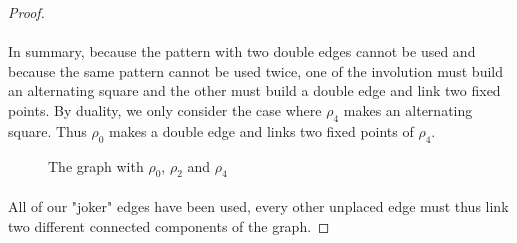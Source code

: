 \begin{proof}
\paragraph{}
In summary, because the pattern with two double edges cannot be used and because the same pattern cannot be used twice, one of the involution must build an alternating square and the other must build a double edge and link two fixed points. By duality, we only consider the case where $\rho_4$ makes an alternating square. Thus $\rho_0$ makes a double edge and links two fixed points of $\rho_4$.

\begin{figure}[H]
  \begin{center}
    \caption{The graph with $\rho_0$, $\rho_2$ and $\rho_4$}
  \end{center}
\end{figure}

\paragraph{}
All of our "joker" edges have been used, every other unplaced edge must thus link two different connected components of the graph.


\end{proof}

